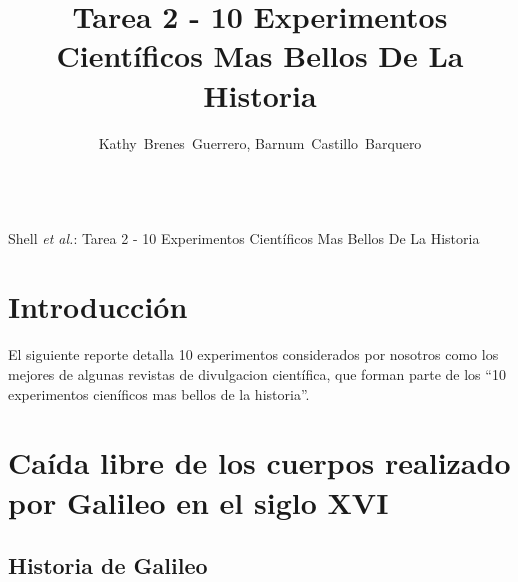 \documentclass[letterpaper, 10pt, journal]{IEEEtran}
\begin{document}
\title{Tarea 2 - 10 Experimentos Cient\'ificos Mas Bellos De La Historia }
\author{Kathy~Brenes~Guerrero, Barnum~Castillo~Barquero

~}%

%
{Shell \MakeLowercase{\textit{et al.}}: Tarea 2 - 10 Experimentos Cient\'ificos Mas Bellos De La Historia }
\maketitle

\begin{IEEEkeywords}

\end{IEEEkeywords}

\section{Introducci\'on}
El siguiente reporte detalla 10 experimentos considerados por nosotros como los mejores de algunas revistas de divulgacion cient\'ifica, que forman parte de los “10 experimentos cien\'ificos mas bellos de la historia”.

\section{Ca\'ida libre de los cuerpos realizado por Galileo en el siglo XVI}

\subsection{Historia de Galileo}
\end{document}
